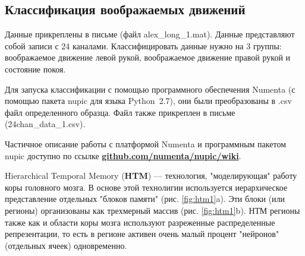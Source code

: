 \documentclass[12 pt, Times New Roman, a4paper]{article}
\begin{document}
\subsection*{Классификация воображаемых движений}

Данные прикреплены в письме (файл alex\_long\_1.mat). Данные представляют собой записи с 24 каналами. Классифицировать данные нужно на 3 группы: воображаемое движение левой рукой, воображаемое движение правой рукой и состояние покоя.

Для запуска классификации с помощью программного обеспечения Numenta (с помощью пакета nupic для языка Python~2.7), они были преобразованы в .csv файл определенного образца. Файл также прикреплен в письме (24chan\_data\_1.csv).

Частичное описание работы с платформой Numenta и программным пакетом nupic доступно по ссылке \textbf{\href{https://github.com/numenta/nupic/wiki}{github.com/numenta/nupic/wiki}}.

Hierarchical Temporal Memory (\textbf{HTM}) --- технология, "моделирующая" работу коры головного мозга. В основе этой технолигии используется иерархическое представление отдельных "блоков памяти" (рис. \ref{fig:htm1}a). Эти блоки (или регионы) организованы как трехмерный массив (рис. \ref{fig:htm1}b). НТМ регионы также как и области коры мозга используют разреженные распределенные репрезентации, то есть в регионе активен очень малый процент "нейронов" (отдельных ячеек) одновременно.  
\end{document}
